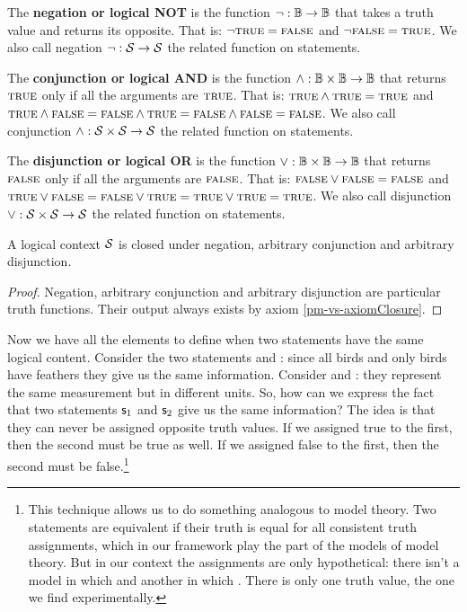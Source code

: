 \begin{mathSection}
	\begin{defn}
		The \textbf{negation or logical NOT} is the function $\neg : \mathbb{B} \to \mathbb{B}$ that takes a truth value and returns its opposite. That is: $\neg \textup{\textsc{true}} = \textup{\textsc{false}}$ and $\neg \textup{\textsc{false}} = \textup{\textsc{true}}$. We also call negation $\neg: \mathcal{S} \to \mathcal{S}$ the related function on statements.
	\end{defn}
	
	\begin{defn}
		The \textbf{conjunction or logical AND} is the function $\wedge : \mathbb{B} \times \mathbb{B} \to \mathbb{B}$ that returns $\textup{\textsc{true}}$ only if all the arguments are $\textup{\textsc{true}}$. That is: $\textup{\textsc{true}} \wedge \textup{\textsc{true}} = \textup{\textsc{true}}$ and $\textup{\textsc{true}} \wedge \textup{\textsc{false}} =\textup{\textsc{false}} \wedge \textup{\textsc{true}} =\textup{\textsc{false}} \wedge \textup{\textsc{false}} = \textup{\textsc{false}}$. We also call conjunction $\wedge : \mathcal{S} \times \mathcal{S} \to \mathcal{S}$ the related function on statements.
	\end{defn}
	
	\begin{defn}
		The \textbf{disjunction or logical OR} is the function $\vee : \mathbb{B} \times \mathbb{B} \to \mathbb{B}$ that returns $\textup{\textsc{false}}$ only if all the arguments are $\textup{\textsc{false}}$. That is: $\textup{\textsc{false}} \vee \textup{\textsc{false}} = \textup{\textsc{false}}$ and $\textup{\textsc{true}} \vee \textup{\textsc{false}} =\textup{\textsc{false}} \vee \textup{\textsc{true}} =\textup{\textsc{true}} \vee \textup{\textsc{true}} = \textup{\textsc{true}}$.  We also call disjunction $\vee : \mathcal{S} \times \mathcal{S} \to \mathcal{S}$ the related function on statements.
	\end{defn}
	
	\begin{prop}
		A logical context $\mathcal{S}$ is closed under negation, arbitrary conjunction and arbitrary disjunction.
	\end{prop}
	\begin{proof}
		Negation, arbitrary conjunction and arbitrary disjunction are particular truth functions. Their output always exists by axiom \eqref{pm-vs-axiomClosure}.
\end{proof}\end{mathSection}

Now we have all the elements to define when two statements have the same logical content. Consider the two statements  and : since all birds and only birds have feathers they give us the same information. Consider  and : they represent the same measurement but in different units. So, how can we express the fact that two statements $\mathsf{s}_1$ and $\mathsf{s}_2$ give us the same information? The idea is that they can never be assigned opposite truth values. If we assigned true to the first, then the second must be true as well. If we assigned false to the first, then the second must be false.\footnote{This technique allows us to do something analogous to model theory. Two statements are equivalent if their truth is equal for all consistent truth assignments, which in our framework play the part of the models of model theory. But in our context the assignments are only hypothetical: there isn't a model in which  and another in which . There is only one truth value, the one we find experimentally.}

